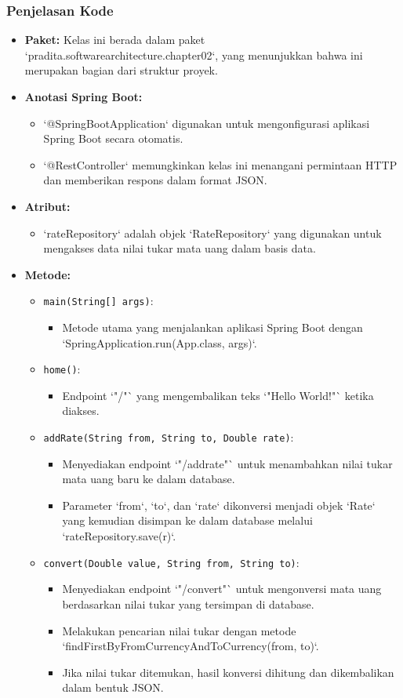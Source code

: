 \subsubsection{Penjelasan Kode}
\begin{itemize}
\item \textbf{Paket:} Kelas ini berada dalam paket `pradita.softwarearchitecture.chapter02`, yang menunjukkan bahwa ini merupakan bagian dari struktur proyek.
\item \textbf{Anotasi Spring Boot:}
\begin{itemize}
\item `@SpringBootApplication` digunakan untuk mengonfigurasi aplikasi Spring Boot secara otomatis.
\item `@RestController` memungkinkan kelas ini menangani permintaan HTTP dan memberikan respons dalam format JSON.
\end{itemize}
\item \textbf{Atribut:}
\begin{itemize}
\item `rateRepository` adalah objek `RateRepository` yang digunakan untuk mengakses data nilai tukar mata uang dalam basis data.
\end{itemize}
\item \textbf{Metode:}
\begin{itemize}
\item \texttt{main(String[] args)}: 
\begin{itemize}
	\item Metode utama yang menjalankan aplikasi Spring Boot dengan `SpringApplication.run(App.class, args)`.
\end{itemize}
\item \texttt{home()}: 
\begin{itemize}
	\item Endpoint `"/"` yang mengembalikan teks `"Hello World!"` ketika diakses.
\end{itemize}
\item \texttt{addRate(String from, String to, Double rate)}:
\begin{itemize}
	\item Menyediakan endpoint `"/addrate"` untuk menambahkan nilai tukar mata uang baru ke dalam database.
	\item Parameter `from`, `to`, dan `rate` dikonversi menjadi objek `Rate` yang kemudian disimpan ke dalam database melalui `rateRepository.save(r)`.
\end{itemize}
\item \texttt{convert(Double value, String from, String to)}:
\begin{itemize}
	\item Menyediakan endpoint `"/convert"` untuk mengonversi mata uang berdasarkan nilai tukar yang tersimpan di database.
	\item Melakukan pencarian nilai tukar dengan metode `findFirstByFromCurrencyAndToCurrency(from, to)`.
	\item Jika nilai tukar ditemukan, hasil konversi dihitung dan dikembalikan dalam bentuk JSON.
\end{itemize}
\end{itemize}
\end{itemize}

